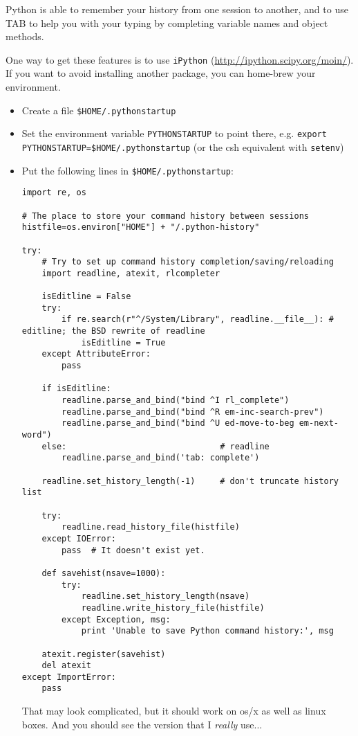 
Python is able to remember your history from one session to another, and to use TAB to help you with your
typing by completing variable names and object methods.

One way to get these features is to use \verb|iPython| (\url{http://ipython.scipy.org/moin/}).  If you want to avoid installing another package, you can home-brew your environment.

\begin{itemize}
  \item Create a file \verb|$HOME/.pythonstartup|
  \item Set the environment variable \verb|PYTHONSTARTUP| to point there, e.g. \verb|export PYTHONSTARTUP=$HOME/.pythonstartup| (or the csh equivalent with \verb|setenv|)
  \item Put the following lines in \verb|$HOME/.pythonstartup|:
\begin{verbatim}
import re, os

# The place to store your command history between sessions
histfile=os.environ["HOME"] + "/.python-history"
            
try:
    # Try to set up command history completion/saving/reloading
    import readline, atexit, rlcompleter

    isEditline = False
    try:
        if re.search(r"^/System/Library", readline.__file__): # editline; the BSD rewrite of readline
            isEditline = True
    except AttributeError:
        pass

    if isEditline:
        readline.parse_and_bind("bind ^I rl_complete")
        readline.parse_and_bind("bind ^R em-inc-search-prev")
        readline.parse_and_bind("bind ^U ed-move-to-beg em-next-word")
    else:                               # readline
        readline.parse_and_bind('tab: complete')

    readline.set_history_length(-1)     # don't truncate history list

    try:
        readline.read_history_file(histfile)
    except IOError:
        pass  # It doesn't exist yet.

    def savehist(nsave=1000):
        try:
            readline.set_history_length(nsave)
            readline.write_history_file(histfile)
        except Exception, msg:
            print 'Unable to save Python command history:', msg

    atexit.register(savehist)
    del atexit
except ImportError:
    pass
\end{verbatim}

That may look complicated, but it should work on os/x as well as linux boxes.  And you should see the version that I \textit{really} use...

\end{itemize}
